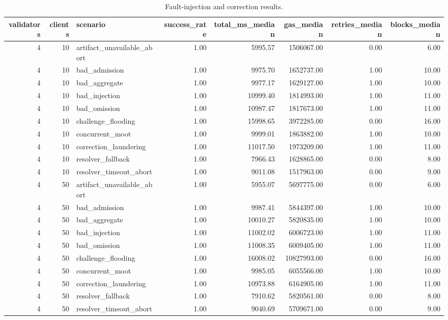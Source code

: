 \begin{table}
\caption{Fault-injection and correction results.}
\label{tab:contestfl-faults}
\begin{tabular}{rrlrrrrr}
\toprule
validators & clients & scenario & success\_rate & total\_ms\_median & gas\_median & retries\_median & blocks\_median \\
\midrule
4 & 10 & artifact\_unavailable\_abort & 1.00 & 5995.57 & 1506067.00 & 0.00 & 6.00 \\
4 & 10 & bad\_admission & 1.00 & 9975.70 & 1652737.00 & 1.00 & 10.00 \\
4 & 10 & bad\_aggregate & 1.00 & 9977.17 & 1629127.00 & 1.00 & 10.00 \\
4 & 10 & bad\_injection & 1.00 & 10999.40 & 1814993.00 & 1.00 & 11.00 \\
4 & 10 & bad\_omission & 1.00 & 10987.47 & 1817673.00 & 1.00 & 11.00 \\
4 & 10 & challenge\_flooding & 1.00 & 15998.65 & 3972285.00 & 0.00 & 16.00 \\
4 & 10 & concurrent\_moot & 1.00 & 9999.01 & 1863882.00 & 1.00 & 10.00 \\
4 & 10 & correction\_laundering & 1.00 & 11017.50 & 1973209.00 & 1.00 & 11.00 \\
4 & 10 & resolver\_fallback & 1.00 & 7966.43 & 1628865.00 & 0.00 & 8.00 \\
4 & 10 & resolver\_timeout\_abort & 1.00 & 9011.08 & 1517963.00 & 0.00 & 9.00 \\
4 & 50 & artifact\_unavailable\_abort & 1.00 & 5955.07 & 5697775.00 & 0.00 & 6.00 \\
4 & 50 & bad\_admission & 1.00 & 9987.41 & 5844397.00 & 1.00 & 10.00 \\
4 & 50 & bad\_aggregate & 1.00 & 10010.27 & 5820835.00 & 1.00 & 10.00 \\
4 & 50 & bad\_injection & 1.00 & 11002.02 & 6006723.00 & 1.00 & 11.00 \\
4 & 50 & bad\_omission & 1.00 & 11008.35 & 6009405.00 & 1.00 & 11.00 \\
4 & 50 & challenge\_flooding & 1.00 & 16008.02 & 10827993.00 & 0.00 & 16.00 \\
4 & 50 & concurrent\_moot & 1.00 & 9985.05 & 6055566.00 & 1.00 & 10.00 \\
4 & 50 & correction\_laundering & 1.00 & 10973.88 & 6164905.00 & 1.00 & 11.00 \\
4 & 50 & resolver\_fallback & 1.00 & 7910.62 & 5820561.00 & 0.00 & 8.00 \\
4 & 50 & resolver\_timeout\_abort & 1.00 & 9040.69 & 5709671.00 & 0.00 & 9.00 \\

\end{tabular}
\end{table}
